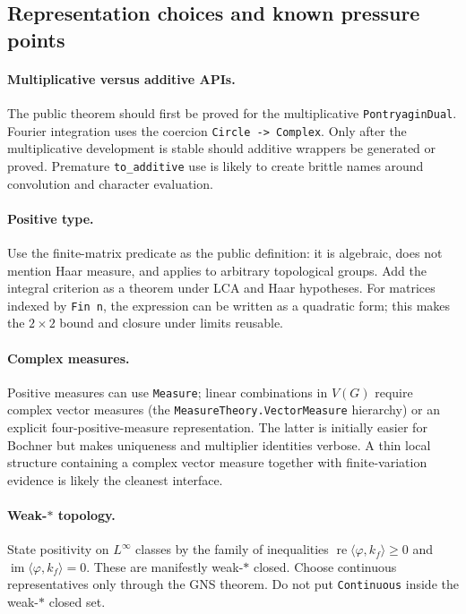 \documentclass[11pt]{article}
\theoremstyle{definition}
\theoremstyle{remark}
\newcommand{\Lp}[1]{L^{#1}}
\begin{document}
\subsection{Representation choices and known pressure points}

\paragraph{Multiplicative versus additive APIs.}
The public theorem should first be proved for the multiplicative
\texttt{PontryaginDual}.  Fourier integration uses the coercion
\texttt{Circle -> Complex}.  Only after the multiplicative development is stable should
additive wrappers be generated or proved.  Premature \texttt{to\_additive} use is likely
to create brittle names around convolution and character evaluation.

\paragraph{Positive type.}
Use the finite-matrix predicate as the public definition: it is algebraic, does not
mention Haar measure, and applies to arbitrary topological groups.  Add the integral
criterion as a theorem under LCA and Haar hypotheses.  For matrices indexed by
\texttt{Fin n}, the expression can be written as a quadratic form; this makes the
$2\times2$ bound and closure under limits reusable.

\paragraph{Complex measures.}
Positive measures can use \texttt{Measure}; linear combinations in $V(G)$ require
complex vector measures (the \texttt{MeasureTheory.VectorMeasure} hierarchy) or an
explicit four-positive-measure representation.  The latter is initially easier for
Bochner but makes uniqueness and multiplier identities verbose.  A thin local structure
containing a complex vector measure together with finite-variation evidence is likely the
cleanest interface.

\paragraph{Weak-$*$ topology.}
State positivity on $\Lp\infty$ classes by the family of inequalities
$\operatorname{re}\langle\varphi,k_f\rangle\geq0$ and
$\operatorname{im}\langle\varphi,k_f\rangle=0$.  These are manifestly weak-$*$ closed.
Choose continuous representatives only through the GNS theorem.  Do not put
\texttt{Continuous} inside the weak-$*$ closed set.
\end{document}

